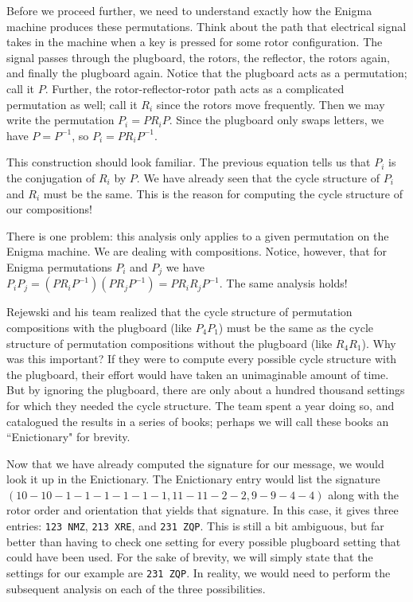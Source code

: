 \documentclass{book}
\theoremstyle{plain}
\theoremstyle{definition}
\newcommand{\ciphertext}[1]{\texttt{#1}} %
\begin{document}
Before we proceed further, we need to understand exactly how the Enigma machine produces these permutations. Think about the path that electrical signal takes in the machine when a key is pressed for some rotor configuration. The signal passes through the plugboard, the rotors, the reflector, the rotors again, and finally the plugboard again. Notice that the plugboard acts as a permutation; call it $P$. Further, the rotor-reflector-rotor path acts as a complicated permutation as well; call it $R_i$ since the rotors move frequently. Then we may write the permutation $P_i = PR_iP$. Since the plugboard only swaps letters, we have $P = P^{-1}$, so $P_i = PR_iP^{-1}$.

This construction should look familiar. The previous equation tells us that $P_i$ is the conjugation of $R_i$ by $P$. We have already seen that the cycle structure of $P_i$ and $R_i$ must be the same. This is the reason for computing the cycle structure of our compositions!

There is one problem: this analysis only applies to a given permutation on the Enigma machine. We are dealing with compositions. Notice, however, that for Enigma permutations $P_i$ and $P_j$ we have $P_iP_j = (PR_iP^{-1})(PR_jP^{-1}) = PR_iR_jP^{-1}$. The same analysis holds!

Rejewski and his team realized that the cycle structure of permutation compositions with the plugboard (like $P_4P_1$) must be the same as the cycle structure of permutation compositions without the plugboard (like $R_4R_1$). Why was this important? If they were to compute every possible cycle structure with the plugboard, their effort would have taken an unimaginable amount of time. But by ignoring the plugboard, there are only about a hundred thousand settings for which they needed the cycle structure. The team spent a year doing so, and catalogued the results in a series of books; perhaps we will call these books an ``Enictionary" for brevity.

Now that we have already computed the signature for our message, we would look it up in the Enictionary. The Enictionary entry would list the signature $(10-10-1-1-1-1-1-1,11-11-2-2,9-9-4-4)$ along with the rotor order and orientation that yields that signature. In this case, it gives three entries: \ciphertext{123 NMZ}, \ciphertext{213 XRE}, and \ciphertext{231 ZQP}. This is still a bit ambiguous, but far better than having to check one setting for every possible plugboard setting that could have been used. For the sake of brevity, we will simply state that the settings for our example are \ciphertext{231 ZQP}. In reality, we would need to perform the subsequent analysis on each of the three possibilities.
\end{document}
